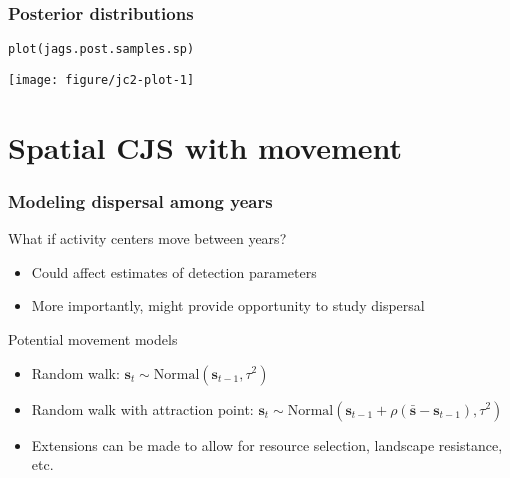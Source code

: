 \documentclass[color=usenames,dvipsnames]{beamer}\usepackage[]{graphicx}\usepackage[]{xcolor}
\makeatletter
\newcommand{\hlstd}[1]{\textcolor[rgb]{0,0,0}{#1}}%
\newcommand{\hlkwd}[1]{\textcolor[rgb]{0.004,0.004,0.506}{#1}}%
\newenvironment{kframe}{%
 \def\at@end@of@kframe{}%
 \ifinner\ifhmode%
  \def\at@end@of@kframe{\end{minipage}}%
  \begin{minipage}{\columnwidth}%
 \fi\fi%
 \def\FrameCommand##1{\hskip\@totalleftmargin \hskip-\fboxsep
 \colorbox{shadecolor}{##1}\hskip-\fboxsep
     \hskip-\linewidth \hskip-\@totalleftmargin \hskip\columnwidth}%
 \MakeFramed {\advance\hsize-\width
   \@totalleftmargin\z@ \linewidth\hsize
   \@setminipage}}%
 {\par\unskip\endMakeFramed%
 \at@end@of@kframe}
\newenvironment{knitrout}{}{} %
\makeatother
\begin{document}
\begin{frame}[fragile]
  \frametitle{Posterior distributions}
\begin{knitrout}\scriptsize
{}\color{fgcolor}\begin{kframe}
\begin{alltt}
\hlkwd{plot}\hlstd{(jags.post.samples.sp)}
\end{alltt}
\end{kframe}

{\centering \texttt{[image: figure/jc2-plot-1]} 

}


\end{knitrout}
\end{frame}










\section{Spatial CJS with movement}









\begin{frame}
  \frametitle{Modeling dispersal among years}
  {\large What if activity centers move between years?}
  \begin{itemize}
    \normalsize
    \item Could affect estimates of detection parameters
    \item More importantly, might provide opportunity to study dispersal
  \end{itemize}
  \pause
  \vfill
  {\large Potential movement models}
  \begin{itemize}
    \normalsize
    \item Random walk: ${\bm s}_t \sim \mbox{Normal}({\bm s}_{t-1}, \tau^2)$
    \item Random walk with attraction point: ${\bm s}_t \sim \mbox{Normal}({\bm  s}_{t-1} + \rho(\bar{\bm s} - {\bm s}_{t-1}), \tau^2)$
    \item Extensions can be made to allow for resource selection,
      landscape resistance, etc.%
  \end{itemize}
\end{frame}
\end{document}
